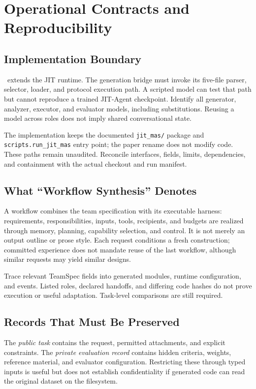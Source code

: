 \section{Operational Contracts and Reproducibility}
\label{app:reporting}

\subsection{Implementation Boundary}

\method\ extends the JIT runtime. The generation bridge must invoke its five-file parser, selector, loader, and protocol execution path. A scripted model can test that path but cannot reproduce a trained JIT-Agent checkpoint. Identify all generator, analyzer, executor, and evaluator models, including substitutions. Reusing a model across roles does not imply shared conversational state.

The implementation keeps the documented \texttt{jit\_mas/} package and \texttt{scripts.run\_jit\_mas} entry point; the paper rename does not modify code. These paths remain unaudited. Reconcile interfaces, fields, limits, dependencies, and containment with the actual checkout and run manifest.

\subsection{What ``Workflow Synthesis'' Denotes}

A workflow combines the team specification with its executable harness: requirements, responsibilities, inputs, tools, recipients, and budgets are realized through memory, planning, capability selection, and control. It is not merely an output outline or prose style. Each request conditions a fresh construction; committed experience does not mandate reuse of the last workflow, although similar requests may yield similar designs.

Trace relevant TeamSpec fields into generated modules, runtime configuration, and events. Listed roles, declared handoffs, and differing code hashes do not prove execution or useful adaptation. Task-level comparisons are still required.

\subsection{Records That Must Be Preserved}

The \emph{public task} contains the request, permitted attachments, and explicit constraints. The \emph{private evaluation record} contains hidden criteria, weights, reference material, and evaluator configuration. Restricting these through typed inputs is useful but does not establish confidentiality if generated code can read the original dataset on the filesystem.

